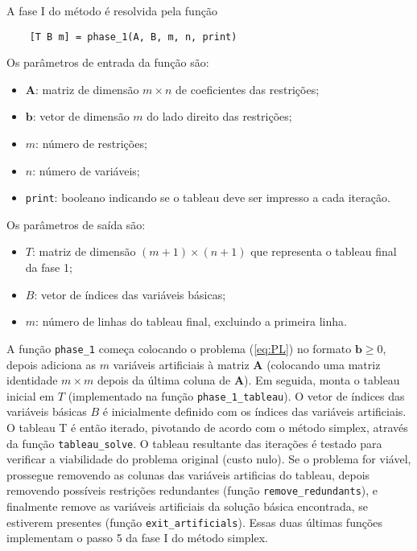 \documentclass[12pt,a4paper]{article}
\newcommand{\vet}{\mathbf}                                   %
\begin{document}
A fase I do método é resolvida pela função
%
\begin{verbatim}
	[T B m] = phase_1(A, B, m, n, print)
\end{verbatim}
%
Os parâmetros de entrada da função são:
%
\begin{itemize}
	\item $\vet{A}$: matriz de dimensão $m \times n$ de coeficientes das restrições;
	\item $\vet{b}$: vetor de dimensão $m$ do lado direito das restrições;
	\item $m$: número de restrições;
	\item $n$: número de variáveis;
	\item \verb|print|: booleano indicando se o tableau deve ser impresso a cada iteração.  
\end{itemize} 
%
Os parâmetros de saída são:
%
\begin{itemize}
	\item $T$: matriz de dimensão $(m+1) \times (n+1)$ que representa o tableau final da fase 1;
	\item $B$: vetor de índices das variáveis básicas;
	\item $m$: número de linhas do tableau final, excluindo a primeira linha. 
\end{itemize}
%
A função \verb|phase_1| começa colocando o problema (\ref{eq:PL}) no formato $\vet{b} \geq 0$,
depois adiciona as $m$ variáveis artificiais à matriz $\vet{A}$ (colocando uma matriz identidade
$m \times m$ depois da última coluna de $\vet{A}$). Em seguida, monta o tableau inicial em $T$
(implementado na função \verb|phase_1_tableau|). O vetor de índices das variáveis básicas $B$ é
inicialmente definido com os índices das variáveis artificiais. O tableau T é então iterado, 
pivotando de acordo com o método simplex, através da função \verb|tableau_solve|. O tableau
resultante das iterações é testado para verificar a viabilidade do problema original (custo nulo). 
Se o problema for viável, prossegue removendo as colunas das variáveis artificias do tableau, depois
removendo possíveis restrições redundantes (função \verb|remove_redundants|), e finalmente remove
as variáveis artificiais da solução básica encontrada, se estiverem presentes (função 
\verb|exit_artificials|). Essas duas últimas funções implementam o passo 5 da fase I do método 
simplex.
\end{document}
